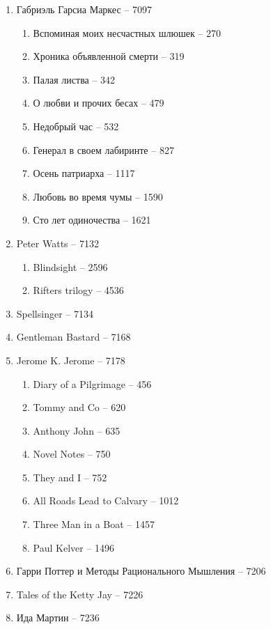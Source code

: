 \documentclass[a4paper, 11pt]{proc} %
\begin{document}
\begin{enumerate}
    \item Габриэль Гарсиа Маркес -- 7097
        \begin{enumerate}
            \item Вспоминая моих несчастных шлюшек -- 270
            \item Хроника объявленной смерти -- 319
            \item Палая листва -- 342
            \item О любви и прочих бесах -- 479
            \item Недобрый час -- 532
            \item Генерал в своем лабиринте -- 827
            \item Осень патриарха -- 1117
            \item Любовь во время чумы -- 1590
            \item Сто лет одиночества -- 1621
        \end{enumerate}
    \item Peter Watts -- 7132
        \begin{enumerate}
            \item Blindsight -- 2596
            \item Rifters trilogy -- 4536
        \end{enumerate}
    \item Spellsinger -- 7134
    \item Gentleman Bastard -- 7168
    \item Jerome K. Jerome -- 7178
        \begin{enumerate}
            \item Diary of a Pilgrimage -- 456
            \item Tommy and Co -- 620
            \item Anthony John -- 635
            \item Novel Notes -- 750
            \item They and I -- 752
            \item All Roads Lead to Calvary -- 1012
            \item Three Man in a Boat -- 1457
            \item Paul Kelver -- 1496
        \end{enumerate}
    \item Гарри Поттер и Методы Рационального Мышления -- 7206
    \item Tales of the Ketty Jay -- 7226
    \item Ида Мартин -- 7236

\end{enumerate}
\end{document}
